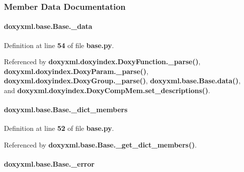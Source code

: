 \subsubsection{Member Data Documentation}
\paragraph[{\+\_\+data}]{\setlength{\rightskip}{0pt plus 5cm}doxyxml.\+base.\+Base.\+\_\+data\hspace{0.3cm}{\ttfamily [private]}}\label{classdoxyxml_1_1base_1_1Base_a41ae3f7ddf0d4bbc6116df9fc92a3000}


Definition at line {\bf 54} of file {\bf base.\+py}.



Referenced by {\bf doxyxml.\+doxyindex.\+Doxy\+Function.\+\_\+parse()}, {\bf doxyxml.\+doxyindex.\+Doxy\+Param.\+\_\+parse()}, {\bf doxyxml.\+doxyindex.\+Doxy\+Group.\+\_\+parse()}, {\bf doxyxml.\+base.\+Base.\+data()}, and {\bf doxyxml.\+doxyindex.\+Doxy\+Comp\+Mem.\+set\+\_\+descriptions()}.

\paragraph[{\+\_\+dict\+\_\+members}]{\setlength{\rightskip}{0pt plus 5cm}doxyxml.\+base.\+Base.\+\_\+dict\+\_\+members\hspace{0.3cm}{\ttfamily [private]}}\label{classdoxyxml_1_1base_1_1Base_a4afa5c206e82808547e71d5348076734}


Definition at line {\bf 52} of file {\bf base.\+py}.



Referenced by {\bf doxyxml.\+base.\+Base.\+\_\+get\+\_\+dict\+\_\+members()}.

\paragraph[{\+\_\+error}]{\setlength{\rightskip}{0pt plus 5cm}doxyxml.\+base.\+Base.\+\_\+error\hspace{0.3cm}{\ttfamily [private]}}\label{classdoxyxml_1_1base_1_1Base_a57a08957a5c3c6aacc440e6d5de5acbd}



